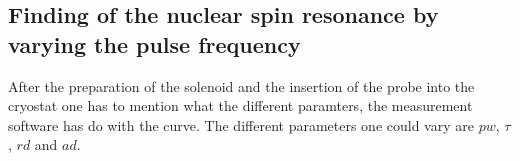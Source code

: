     \subsection{Finding of the nuclear spin resonance by varying the pulse frequency}
    \label{task_2}
    
    After the preparation of the solenoid and the insertion of the probe into the cryostat one has to mention what the different paramters, the measurement software has do with the curve. The different parameters one could vary are $pw$, $\tau$, $rd$ and $ad$. 
        \begin{figure}[h]

\end{figure}

